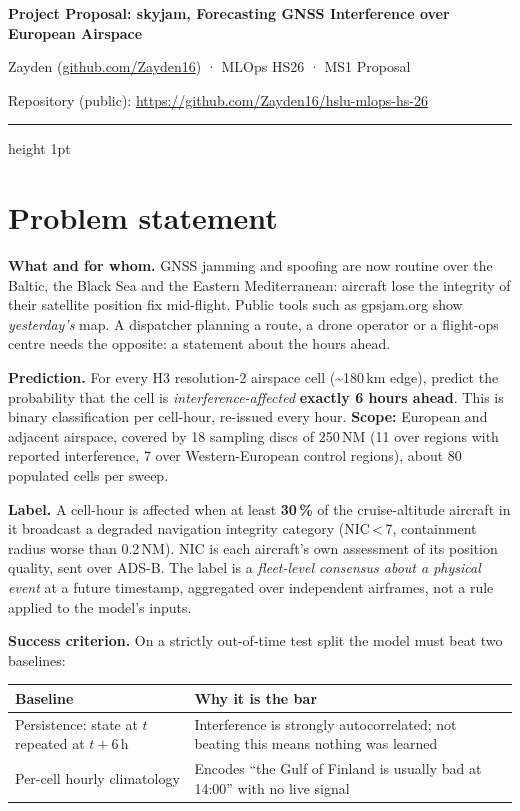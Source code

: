 \documentclass[10pt,a4paper]{article}
\newcommand{\repo}{https://github.com/Zayden16/hslu-mlops-hs-26}
\begin{document}
{\color{hslu}\Large\bfseries Project Proposal: skyjam, Forecasting GNSS Interference over European Airspace\par}
\vspace{0.35ex}
{\small Zayden (\href{https://github.com/Zayden16}{github.com/Zayden16}) · MLOps HS26 · MS1 Proposal\par}
{\small Repository (public): \url{\repo}\par}
\vspace{0.4ex}
{\color{hslu}\hrule height 1pt}
\vspace{0.3ex}

\section{Problem statement}

\textbf{What and for whom.} GNSS jamming and spoofing are now routine over the Baltic,
the Black Sea and the Eastern Mediterranean: aircraft lose the integrity of their
satellite position fix mid-flight. Public tools such as gpsjam.org show \emph{yesterday's}
map. A dispatcher planning a route, a drone operator or a flight-ops centre needs the
opposite: a statement about the hours ahead.

\textbf{Prediction.} For every H3 resolution-2 airspace cell (\textasciitilde180\,km
edge), predict the probability that the cell is \emph{interference-affected}
\textbf{exactly 6 hours ahead}. This is binary classification per cell-hour, re-issued
every hour. \textbf{Scope:} European and adjacent airspace, covered by 18 sampling discs
of 250\,NM (11 over regions with reported interference, 7 over Western-European control
regions), about 80 populated cells per sweep.

\textbf{Label.} A cell-hour is affected when at least \textbf{30\,\%} of the
cruise-altitude aircraft in it broadcast a degraded navigation integrity category
(NIC\,<\,7, containment radius worse than 0.2\,NM). NIC is each aircraft's own assessment
of its position quality, sent over ADS-B. The label is a \emph{fleet-level consensus about
a physical event} at a future timestamp, aggregated over independent airframes, not a rule
applied to the model's inputs.

\textbf{Success criterion.} On a strictly out-of-time test split the model must beat two
baselines:

\begin{tabularx}{\linewidth}{@{}lX@{}}
\toprule
\textbf{Baseline} & \textbf{Why it is the bar} \\
\midrule
Persistence: state at $t$ repeated at $t+6\,\text{h}$ & Interference is strongly autocorrelated; not beating this means nothing was learned \\
Per-cell hourly climatology & Encodes ``the Gulf of Finland is usually bad at 14:00'' with no live signal \\
\bottomrule
\end{tabularx}
\end{document}
